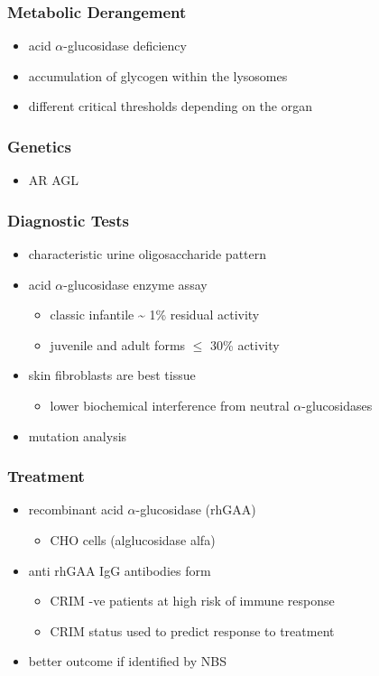 \documentclass{scrartcl}
\begin{document}
\subsubsection{Metabolic Derangement}
\label{sec:org8d071f2}
\begin{itemize}
\item acid \(\alpha\)-glucosidase deficiency
\item accumulation of glycogen within the lysosomes
\item different critical thresholds depending on the organ
\end{itemize}
\subsubsection{Genetics}
\label{sec:org7084bad}
\begin{itemize}
\item AR AGL
\end{itemize}
\subsubsection{Diagnostic Tests}
\label{sec:orgda3d999}
\begin{itemize}
\item characteristic urine oligosaccharide pattern
\item acid \(\alpha\)-glucosidase enzyme assay
\begin{itemize}
\item classic infantile \textasciitilde{} 1\% residual activity
\item juvenile and adult forms \(\le\) 30\% activity
\end{itemize}
\item skin fibroblasts are best tissue
\begin{itemize}
\item lower biochemical interference from neutral \(\alpha\)-glucosidases
\end{itemize}
\item mutation analysis
\end{itemize}
\subsubsection{Treatment}
\label{sec:orgaa04628}
\begin{itemize}
\item recombinant acid \(\alpha\)-glucosidase (rhGAA)
\begin{itemize}
\item CHO cells (alglucosidase alfa)
\end{itemize}
\item anti rhGAA IgG antibodies form
\begin{itemize}
\item CRIM -ve patients at high risk of immune response
\item CRIM status used to predict response to treatment
\end{itemize}
\item better outcome if identified by NBS
\end{itemize}
\end{document}

